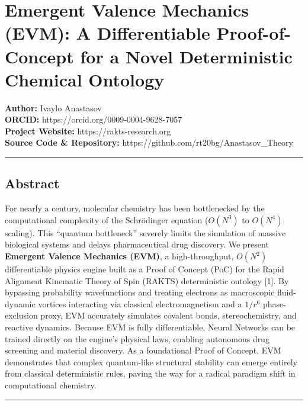 \documentclass[
]{article}
\author{}
\date{}
\begin{document}
\section{Emergent Valence Mechanics (EVM): A Differentiable
Proof-of-Concept for a Novel Deterministic Chemical
Ontology}\label{emergent-valence-mechanics-evm-a-differentiable-proof-of-concept-for-a-novel-deterministic-chemical-ontology}

\textbf{Author:} Ivaylo Anastasov\\
\textbf{ORCID:} https://orcid.org/0009-0004-9628-7057\\
\textbf{Project Website:} https://rakts-research.org\\
\textbf{Source Code \& Repository:}
https://github.com/rt20bg/Anastasov\_Theory

\begin{center}\rule{0.5\linewidth}{0.5pt}\end{center}

\subsection{Abstract}\label{abstract}

For nearly a century, molecular chemistry has been bottlenecked by the
computational complexity of the Schrödinger equation (\(O(N^3)\) to
\(O(N^4)\) scaling). This ``quantum bottleneck'' severely limits the
simulation of massive biological systems and delays pharmaceutical drug
discovery. We present \textbf{Emergent Valence Mechanics (EVM)}, a
high-throughput, \(O(N^2)\) differentiable physics engine built as a
Proof of Concept (PoC) for the Rapid Alignment Kinematic Theory of Spin
(RAKTS) deterministic ontology {[}1{]}. By bypassing probability
wavefunctions and treating electrons as macroscopic fluid-dynamic
vortices interacting via classical electromagnetism and a \(1/r^6\)
phase-exclusion proxy, EVM accurately simulates covalent bonds,
stereochemistry, and reactive dynamics. Because EVM is fully
differentiable, Neural Networks can be trained directly on the engine's
physical laws, enabling autonomous drug screening and material
discovery. As a foundational Proof of Concept, EVM demonstrates that
complex quantum-like structural stability can emerge entirely from
classical deterministic rules, paving the way for a radical paradigm
shift in computational chemistry.

\begin{center}\rule{0.5\linewidth}{0.5pt}\end{center}
\end{document}
